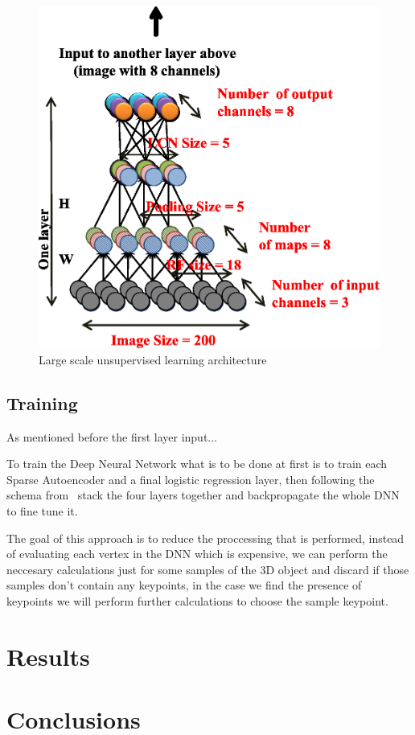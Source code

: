 \documentclass{comjnl}
\begin{document}
\begin{figure}
\includegraphics[width=0.9\linewidth]{architecture.png}
\caption{Large scale unsupervised learning architecture \cite{UnsLearning}}
\label{fig:architecture}
\end{figure}

\subsection{Training}
As mentioned before the first layer input...

To train the Deep Neural Network what is to be done at first is to train each
Sparse Autoencoder and a final logistic regression layer, then following the
schema from~\cite{DNN} stack the four layers together and backpropagate the
whole DNN to fine tune it.

The goal of this approach is to reduce the proccessing that is performed,
instead of evaluating each vertex in the DNN which is expensive, we can
perform the neccesary calculations just for some samples of the 3D object
and discard if those samples don't contain any keypoints, in the case we find
the presence of keypoints we will perform further calculations to choose the
sample keypoint.

\section{Results} \label{Results}

\section{Conclusions} \label{Conclusions}



\nocite{*}


% 

\end{document}
